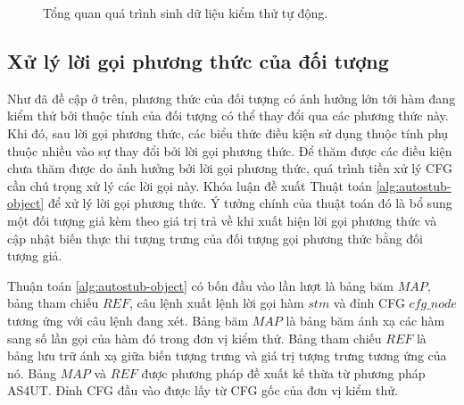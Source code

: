 \begin{figure}[hb]
	\centering
	
	\caption{Tổng quan quá trình sinh dữ liệu kiểm thử tự động.}
	\label{fig:autogen-flow}
\end{figure}

\subsection{Xử lý lời gọi phương thức của đối tượng} \label{sec:autostub-obj}
Như đã đề cập ở trên, phương thức của đối tượng có ảnh hưởng lớn tới hàm đang kiểm thử bởi thuộc tính của đối tượng có thể thay đổi qua các phương thức này. Khi đó, sau lời gọi phương thức, các biểu thức điều kiện sử dụng thuộc tính phụ thuộc nhiều vào sự thay đổi bởi lời gọi phương thức. Để thăm được các điều kiện chưa thăm được do ảnh hưởng bởi lời gọi phương thức, quá trình tiền xử lý CFG cần chú trọng xử lý các lời gọi này. Khóa luận đề xuất Thuật toán \autoref{alg:autostub-object} để xử lý lời gọi phương thức. Ý tưởng chính của thuật toán đó là bổ sung một đối tượng giả kèm theo giá trị trả về khi xuất hiện lời gọi phương thức và cập nhật biến thực thi tượng trưng của đối tượng gọi phương thức bằng đối tượng giả. 

Thuận toán \autoref{alg:autostub-object} có bốn đầu vào lần lượt là bảng băm $MAP$, bảng tham chiếu $REF$, câu lệnh xuất lệnh lời gọi hàm $stm$ và đỉnh CFG $cfg\_node$ tương ứng với câu lệnh đang xét. Bảng băm $MAP$ là bảng băm ánh xạ các hàm sang số lần gọi của hàm đó trong đơn vị kiểm thử. Bảng tham chiếu $REF$ là bảng lưu trữ ánh xạ giữa biến tượng trưng và giá trị tượng trưng tương ứng của nó. Bảng $MAP$ và $REF$ được phương pháp đề xuất kế thừa từ phương pháp AS4UT. Đỉnh CFG đầu vào được lấy từ CFG gốc của đơn vị kiểm thử. 

